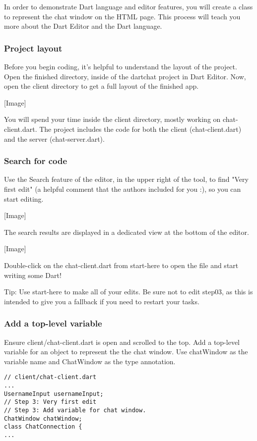 In order to demonstrate Dart language and editor features, you will create a class to represent the chat window on the HTML page. This process will teach you more about the Dart Editor and the Dart language.

\subsubsection{Project layout}

Before you begin coding, it's helpful to understand the layout of the project. Open the finished directory, inside of the dartchat project in Dart Editor. Now, open the client directory to get a full layout of the finished app.

[Image]

You will spend your time inside the client directory, mostly working on chat-client.dart. The project includes the code for both the client (chat-client.dart) and the server (chat-server.dart).

\subsubsection{Search for code}

Use the Search feature of the editor, in the upper right of the tool, to find "Very first edit" (a helpful comment that the authors included for you :), so you can start editing.

[Image]

The search results are displayed in a dedicated view at the bottom of the editor.

[Image]

Double-click on the chat-client.dart from start-here to open the file and start writing some Dart!

Tip: Use start-here to make all of your edits. Be sure not to edit step03, as this is intended to give you a fallback if you need to restart your tasks.

\subsubsection{Add a top-level variable}

Ensure client/chat-client.dart is open and scrolled to the top. Add a top-level variable for an object to represent the the chat window. Use chatWindow as the variable name and ChatWindow as the type annotation.

\begin{verbatim}
// client/chat-client.dart
...
UsernameInput usernameInput;
// Step 3: Very first edit
// Step 3: Add variable for chat window.
ChatWindow chatWindow;
class ChatConnection {
...
\end{verbatim}

